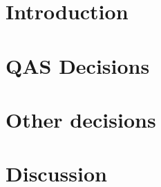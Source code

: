 
\chapter{Introduction}\label{sec:introduction}


\chapter{QAS Decisions}\label{sec:decisions}


\chapter{Other decisions}\label{sec:otherdecisions}



\chapter{Discussion}\label{sec:discussion}